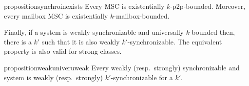 \documentclass[a4paper,UKenglish,cleveref, autoref, thm-restate]{lipics-v2021}
\begin{document}
\begin{restatable}{proposition}{synchroinexists}
  \label{proposition:synchro_in_exists}
  Every  MSC is existentially $k$-p2p-bounded. Moreover, every  mailbox MSC is existentially $k$-mailbox-bounded.
\end{restatable}

Finally, if a system is weakly synchronizable and universally $k$-bounded then, there is a $k'$ such that it is also weakly $k'$-synchronizable. The equivalent property is also valid for strong classes.
\begin{restatable}{proposition}{weakuniveruweak}
  \label{proposition:weak_univer_uweak}
  Every weakly (resp.\ strongly) synchronizable and  system is weakly (resp.\ strongly) $k'$-synchronizable for a $k'$.
\end{restatable}

%
\end{document}
